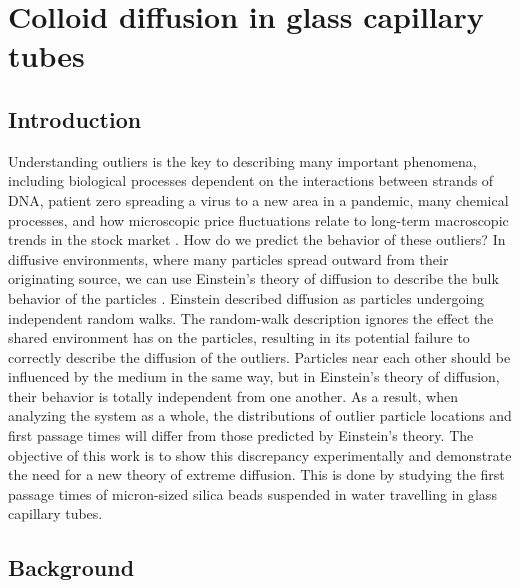 
\chapter{Colloid diffusion in glass capillary tubes}

\label{extras}

\section{Introduction}
Understanding outliers is the key to describing many important phenomena, including biological processes dependent on the interactions between strands of DNA, patient zero spreading a virus to a new area in a pandemic, many chemical processes, and how microscopic price fluctuations relate to long-term macroscopic trends in the stock market \cite{zhang_first-passage_2016, hufnagel_forecast_2004, redner_8_2001, liu_anchoring_2017}. How do we predict the behavior of these outliers? In diffusive environments, where many particles spread outward from their originating source, we can use Einstein’s theory of diffusion to describe the bulk behavior of the particles \cite{einstein_uber_1905, von_smoluchowski_zur_1906}. Einstein described diffusion as particles undergoing independent random walks. The random-walk description ignores the effect the shared environment has on the particles, resulting in its potential failure to correctly describe the diffusion of the outliers. Particles near each other should be influenced by the medium in the same way, but in Einstein’s theory of diffusion, their behavior is totally independent from one another. As a result, when analyzing the system as a whole, the distributions of outlier particle locations and first passage times will differ from those predicted by Einstein’s theory. The objective of this work is to show this discrepancy experimentally and demonstrate the need for a new theory of extreme diffusion. This is done by studying the first passage times of micron-sized silica beads suspended in water travelling in glass capillary tubes.
 
\section{Background}

